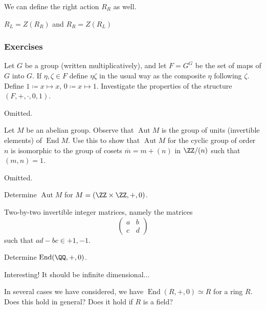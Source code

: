 \documentclass{article}
\newcommand*\isom{\ensuremath{\simeq}}
\newcommand*\Aut{\ensuremath{\operatorname{Aut}}}
\newcommand*\End{\ensuremath{\operatorname{End}}}
\begin{document}
We can define the right action $R_R$ as well.
\begin{theorem}
    $R_L = Z(R_R)$ and $R_R = Z(R_L)$
\end{theorem}

\subsubsection*{Exercises}

\begin{exercise}
    Let $G$ be a group (written multiplicatively), and let $F = G^G$ be the set of maps of $G$ into $G$.
    If $\eta, \zeta \in F$ define $\eta\zeta$ in the usual way as the composite $\eta$ following $\zeta$.
    Define $1 \coloneq x \mapsto x$, $0 \coloneq x \mapsto 1$.
    Investigate the properties of the structure $(F,+,\cdot,0,1)$.
\end{exercise}

Omitted.

\begin{exercise}
    Let $M$ be an abelian group.
    Observe that $\Aut M$ is the group of units (invertible elements) of $\End M$.
    Use this to show that $\Aut M$ for the cyclic group of order $n$ is isomorphic to the group of cosets $\overline{m} = m + (n)$ in $\ZZ/(n)$ such that $(m,n) = 1$.
\end{exercise}

Omitted.

\begin{exercise}
    Determine $\Aut M$ for $M = (\ZZ \times \ZZ, +, 0)$.
\end{exercise}

Two-by-two invertible integer matrices, namely the matrices
\[
    \begin{pmatrix}
        a & b \\
        c & d
    \end{pmatrix}
\]
such that $ad - bc \in {+1,-1}$.

\begin{exercise}
    Determine $\End (\QQ,+,0)$.
\end{exercise}

Interesting! It should be infinite dimensional...

\begin{exercise}
    In several cases we have considered, we have $\End(R,+,0) \isom R$ for a ring $R$.
    Does this hold in general? Does it hold if $R$ is a field?
\end{exercise}
\end{document}

